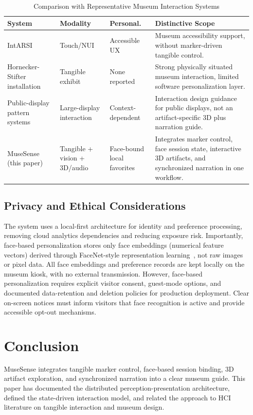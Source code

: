 \documentclass[conference]{IEEEtran}
\begin{document}
\begin{table}[t]
\caption{Comparison with Representative Museum Interaction Systems}
\label{tab:comparison}
\centering
\footnotesize
\setlength{\tabcolsep}{3pt}
\begin{tabular}{@{}>{\raggedright\arraybackslash}p{1.7cm}>{\raggedright\arraybackslash}p{1.3cm}>{\raggedright\arraybackslash}p{1.4cm}>{\raggedright\arraybackslash}p{2.9cm}@{}}
\toprule
System & Modality & Personal. & Distinctive Scope \\
\midrule
IntARSI~\cite{pietroni2021} & Touch/NUI & Accessible UX & Museum accessibility support, without marker-driven tangible control. \\
Hornecker-Stifter installation~\cite{horneckerstifter2006} & Tangible exhibit & None reported & Strong physically situated museum interaction, limited software personalization layer. \\
Public-display pattern systems~\cite{muller2010} & Large-display interaction & Context-dependent & Interaction design guidance for public displays, not an artifact-specific 3D plus narration guide. \\
MuseSense (this paper) & Tangible + vision + 3D/audio & Face-bound local favorites & Integrates marker control, face session state, interactive 3D artifacts, and synchronized narration in one workflow. \\
\bottomrule
\end{tabular}
\end{table}

\subsection{Privacy and Ethical Considerations}
The system uses a local-first architecture for identity and preference processing, removing cloud analytics dependencies and reducing exposure risk. Importantly, face-based personalization stores only face embeddings (numerical feature vectors) derived through FaceNet-style representation learning~\cite{schroff2015}, not raw images or pixel data. All face embeddings and preference records are kept locally on the museum kiosk, with no external transmission. However, face-based personalization requires explicit visitor consent, guest-mode options, and documented data-retention and deletion policies for production deployment. Clear on-screen notices must inform visitors that face recognition is active and provide accessible opt-out mechanisms.

\section{Conclusion}
MuseSense integrates tangible marker control, face-based session binding, 3D artifact exploration, and synchronized narration into a clear museum guide. This paper has documented the distributed perception-presentation architecture, defined the state-driven interaction model, and related the approach to HCI literature on tangible interaction and museum design.
\end{document}
